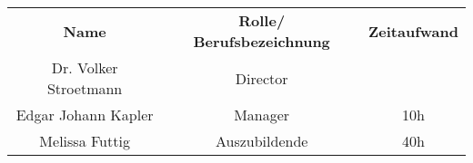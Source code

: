 \begin{tabular}{|c|c|c|}
    \rowcolor{heading}\textbf{Name} & \textbf{Rolle/ Berufsbezeichnung} & \textbf{Zeitaufwand} \\
    Dr. Volker Stroetmann & Director &  \\
    \rowcolor{odd}Edgar Johann Kapler & Manager &  10h \\
    Melissa Futtig & Auszubildende & 40h \\
    \hline
\end{tabular}